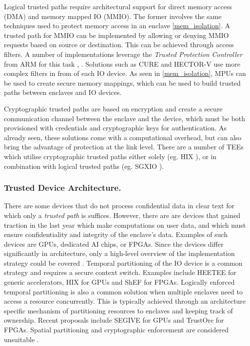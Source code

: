 \documentclass[runningheads,a4paper]{uwsese}
\begin{document}
Logical trusted paths require architectural support for direct memory access
(DMA) and memory mapped IO (MMIO). The former involves the same techniques used
to protect memory access in an enclave \ref{mem_isolation}. A trusted path for
MMIO can be implemented by allowing or denying MMIO requests based on source or
destination. This can be achieved through access filters. A number of
implementations leverage the \emph{Trusted Protection Controller} from ARM for
this task \cite{tee_truz_droid}, \cite{tee_vbutton}. Solutions such as CURE
\cite{tee_cure} and HECTOR-V \cite{tee_hector_v} use more complex filters in
from of each IO device. As seen in \ref{mem_isolation}, MPUs can be used to
create secure memory mappings, which can be used to build trusted paths between
enclaves and IO devices.

Cryptographic trusted paths are based on encryption and create a secure
communication channel between the enclave and the device, which must be both
provisioned with credentials and cryptographic keys for authentication. As
already seen, these solutions come with a computational overhead, but can also
bring the advantage of protection at the link level. There are a number of 
TEEs which utilise cryptographic trusted paths either solely (eg. HIX \cite{tee_hix}), or in combination with logical trusted paths (eg. SGXIO \cite{tee_sgxio}).   

\subsubsection{Trusted Device Architecture.}

There are some devices that do not process confidential data in clear text for
which only a \emph{trusted path} is suffices. However, there are are devices
that gained traction in the last year which make computations on user data, and
which must ensure confidentiality and integrity of the enclave's data. Examples
of such devices are GPUs, dedicated AI chips, or FPGAs. Since the devices
differ significantly in architecture, only a high-level overview of the
implementation strategy could be covered \cite{tee_hw_sup}. Temporal
partitioning of the IO device is a common strategy and requires a secure
context switch. Examples include HEETEE \cite{tee_heetee} for generic
accelerators, HIX \cite{tee_hix} for GPUs and ShEF \cite{tee_shef} for FPGAs.
Logically enforced temporal partitioning is also a common solution when
multiple enclaves need to access a resource concurrently. This is typically
achieved through an architecture specific mechanism of partitioning resources
to enclaves and keeping track of ownership. Recent proposals include SEGIVE
\cite{tee_segive} for GPUs and TrustOre \cite{tee_trustore} for FPGAs. Spatial
partitioning and cryptographic enforcement are considered unsuitable
\cite{tee_hw_sup}.
\end{document}
